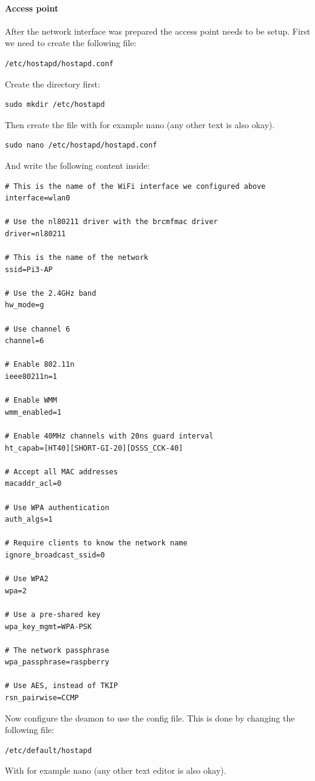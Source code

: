 \documentclass[11pt]{report}
\begin{document}
				\paragraph{Access point} After the network interface was prepared the access point needs to be setup. First we need to create the following file:
				\begin{lstlisting}
/etc/hostapd/hostapd.conf
				\end{lstlisting}
				Create the directory first:
				\begin{lstlisting}
sudo mkdir /etc/hostapd
				\end{lstlisting}
				Then create the file with for example nano (any other text is also okay).
				\begin{lstlisting}
sudo nano /etc/hostapd/hostapd.conf
				\end{lstlisting}
				And write the following content inside:
				\begin{lstlisting}
# This is the name of the WiFi interface we configured above
interface=wlan0

# Use the nl80211 driver with the brcmfmac driver
driver=nl80211

# This is the name of the network
ssid=Pi3-AP

# Use the 2.4GHz band
hw_mode=g

# Use channel 6
channel=6

# Enable 802.11n
ieee80211n=1

# Enable WMM
wmm_enabled=1

# Enable 40MHz channels with 20ns guard interval
ht_capab=[HT40][SHORT-GI-20][DSSS_CCK-40]

# Accept all MAC addresses
macaddr_acl=0

# Use WPA authentication
auth_algs=1

# Require clients to know the network name
ignore_broadcast_ssid=0

# Use WPA2
wpa=2

# Use a pre-shared key
wpa_key_mgmt=WPA-PSK

# The network passphrase
wpa_passphrase=raspberry

# Use AES, instead of TKIP
rsn_pairwise=CCMP
			\end{lstlisting}
			Now configure the deamon to use the config file. This is done by changing the following file:
			\begin{lstlisting}
/etc/default/hostapd
			\end{lstlisting}
			With for example nano (any other text editor is also okay).
\end{document}
